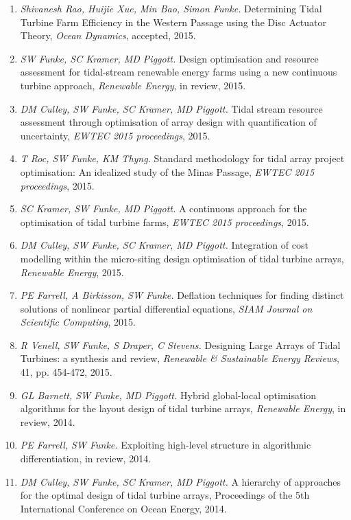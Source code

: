 \documentclass[11pt]{article}
\begin{document}
\newpage
{}
\begin{enumerate}
    \item \textit{Shivanesh Rao, Huijie Xue, Min Bao, Simon Funke.} Determining Tidal Turbine Farm Efficiency in the Western Passage using the Disc Actuator Theory, \textit{Ocean Dynamics}, accepted, 2015.
\item \textit{SW Funke, SC Kramer, MD Piggott.} Design optimisation and resource assessment for tidal-stream renewable energy farms using a new continuous turbine approach, \textit{Renewable Energy}, in review, 2015.
\item \textit{DM Culley, SW Funke, SC Kramer, MD Piggott.} Tidal stream resource assessment through optimisation of array design with quantification of uncertainty, \textit{EWTEC 2015 proceedings}, 2015.
\item \textit{T Roc, SW Funke, KM Thyng.} Standard methodology for tidal array project optimisation: An idealized study of the Minas Passage, \textit{EWTEC 2015 proceedings}, 2015.
\item \textit{SC Kramer, SW Funke, MD Piggott.} A continuous approach for the optimisation of tidal turbine farms, \textit{EWTEC 2015 proceedings}, 2015.
\item \textit{DM Culley, SW Funke, SC Kramer, MD Piggott.} Integration of cost modelling within the micro-siting design optimisation of tidal turbine arrays, \textit{Renewable Energy}, 2015.
\item \textit{PE Farrell, A Birkisson, SW Funke.} Deflation techniques for finding distinct solutions of nonlinear partial differential equations, \textit{SIAM Journal on Scientific Computing}, 2015.
\item \textit{R Venell, SW Funke, S Draper, C Stevens.} Designing Large Arrays of Tidal Turbines: a synthesis and review, \textit{Renewable \& Sustainable Energy Reviews}, 41, pp. 454-472, 2015.
\item \textit{GL Barnett, SW Funke, MD Piggott.} Hybrid global-local optimisation algorithms for the layout design of tidal turbine arrays, \textit{Renewable Energy}, in review, 2014.
\item \textit{PE Farrell, SW Funke.} Exploiting high-level structure in
    algorithmic differentiation, in review, 2014.
\item \textit{DM Culley, SW Funke, SC Kramer, MD Piggott.} A hierarchy of approaches for the optimal design of tidal turbine arrays, Proceedings of the 5th International Conference on Ocean Energy, 2014.

\end{enumerate}
\end{document}
